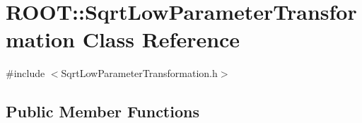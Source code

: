 \hypertarget{classROOT_1_1Minuit2_1_1SqrtLowParameterTransformation}{}\section{R\+O\+OT\+:\+:Sqrt\+Low\+Parameter\+Transformation Class Reference}
\label{classROOT_1_1Minuit2_1_1SqrtLowParameterTransformation}


{\ttfamily \#include $<$Sqrt\+Low\+Parameter\+Transformation.\+h$>$}

\subsection*{Public Member Functions}
